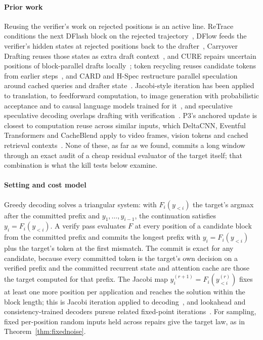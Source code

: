 \paragraph{Prior work} Reusing the verifier's work on rejected positions is an active line. ReTrace conditions the next DFlash block on the rejected trajectory~\cite{retrace2026}, DFlow feeds the verifier's hidden states at rejected positions back to the drafter~\cite{dflow}, Carryover Drafting reuses those states as extra draft context~\cite{carryover2026}, and CURE repairs uncertain positions of block-parallel drafts locally~\cite{cure2026}; token recycling reuses candidate tokens from earlier steps~\cite{tokenrecycling2024}, and CARD and H-Spec restructure parallel speculation around cached queries and drafter state~\cite{card2025,hspec2026}. Jacobi-style iteration has been applied to translation, to feedforward computation, to image generation with probabilistic acceptance and to causal language models trained for it~\cite{santilli2023jacobi,song2021parallel,sjd2025,so2026scd,hu2026jacobiforcing}, and speculative speculative decoding overlaps drafting with verification~\cite{specspec}. P3's anchored update is closest to computation reuse across similar inputs, which DeltaCNN, Eventful Transformers and CacheBlend apply to video frames, vision tokens and cached retrieval contexts~\cite{deltacnn2022,eventful2023,cacheblend2025}. None of these, as far as we found, commits a long window through an exact audit of a cheap residual evaluator of the target itself; that combination is what the kill tests below examine.

\paragraph{Setting and cost model}\label{sec:repair-model}
Greedy decoding solves a triangular system: with $F_i(y_{<i})$ the target's argmax after the committed prefix and $y_1,\dots,y_{i-1}$, the continuation satisfies $y_i=F_i(y_{<i})$. A verify pass evaluates $F$ at every position of a candidate block from the committed prefix and commits the longest prefix with $y_i=F_i(y_{<i})$ plus the target's token at the first mismatch. The commit is exact for any candidate, because every committed token is the target's own decision on a verified prefix and the committed recurrent state and attention cache are those the target computed for that prefix. The Jacobi map $y^{(r+1)}_i=F_i(y^{(r)}_{<i})$ fixes at least one more position per application and reaches the solution within the block length; this is Jacobi iteration applied to decoding~\cite{song2021parallel,santilli2023jacobi}, and lookahead and consistency-trained decoders pursue related fixed-point iterations~\cite{lookahead,cllm}.
For sampling, fixed per-position random inputs held across repairs give the target law, as in Theorem~\ref{thm:fixednoise}.

